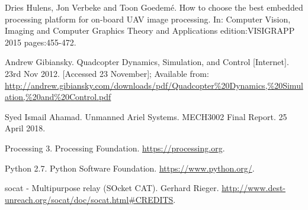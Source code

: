 \documentclass[11pt]{article}
\begin{document}
\begin{thebibliography}{11}
    Dries Hulens, Jon Verbeke and Toon Goedem\'e. How to choose the best embedded processing platform for on-board UAV image processing. In: Computer Vision, Imaging and Computer Graphics Theory and Applications edition:VISIGRAPP 2015 pages:455-472.

    Andrew Gibiansky. Quadcopter Dynamics, Simulation, and Control [Internet]. 23rd Nov 2012. [Accessed 23 November]; Available from: \url{http://andrew.gibiansky.com/downloads/pdf/Quadcopter%20Dynamics,%20Simulation,%20and%20Control.pdf}

    Syed Ismail Ahamad. Unmanned Ariel Systems. MECH3002 Final Report. 25 April 2018.

    Processing 3. Processing Foundation. \url{https://processing.org}.

    Python 2.7. Python Software Foundation. \url{https://www.python.org/}.

    socat - Multipurpose relay (SOcket CAT). Gerhard Rieger. \url{http://www.dest-unreach.org/socat/doc/socat.html#CREDITS}.

\end{thebibliography}
\end{document}
